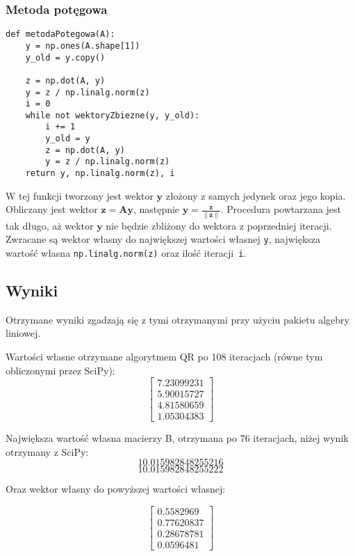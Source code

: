 \documentclass[a4paper,11pt]{article}
\begin{document}
\pagebreak

\subsubsection{Metoda potęgowa}

\begin{lstlisting}[caption={Metoda potęgowa}]
def metodaPotegowa(A):
    y = np.ones(A.shape[1])
    y_old = y.copy()

    z = np.dot(A, y)
    y = z / np.linalg.norm(z)
    i = 0
    while not wektoryZbiezne(y, y_old):
        i += 1
        y_old = y
        z = np.dot(A, y)
        y = z / np.linalg.norm(z)
    return y, np.linalg.norm(z), i
\end{lstlisting}

W tej funkcji tworzony jest wektor \(\mathbf{y}\) złożony z samych jedynek
oraz jego kopia. Obliczany jest wektor \(\mathbf{z} = \mathbf{A}\mathbf{y}\),
następnie \(\mathbf{y}=\frac{\mathbf{z}}{\|\mathbf{z}\|}\). Procedura powtarzana
jest tak długo, aż wektor \(\mathbf{y}\) nie będzie zbliżony do wektora
z poprzedniej iteracji. Zwracane są wektor własny do największej wartości 
własnej \texttt{y}, największa wartość własna \texttt{np.linalg.norm(z)} oraz
ilość iteracji~\texttt{i}.

\subsection{Wyniki}

Otrzymane wyniki zgadzają się z tymi otrzymanymi przy użyciu pakietu algebry
liniowej.

Wartości własne otrzymane algorytmem QR po 108 iteracjach 
(równe tym obliczonymi przez SciPy):
\[
\begin{bmatrix}
    7.23099231 \\ 5.90015727 \\ 4.81580659 \\ 1.05304383
\end{bmatrix}
\]

Największa wartość własna macierzy B, otrzymana po 76 iteracjach, niżej wynik
otrzymany z SciPy:
\[10.015982848255216\]
\[10.015982848255222\]

Oraz wektor własny do powyższej wartości własnej:

\[
\begin{bmatrix}
    0.5582969 \\ 0.77620837 \\ 0.28678781 \\ 0.0596481
\end{bmatrix}
\]
\end{document}
